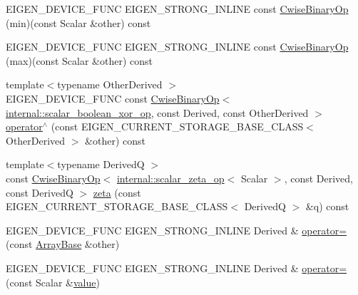 \begin{DoxyCompactItemize}
\item 
E\+I\+G\+E\+N\+\_\+\+D\+E\+V\+I\+C\+E\+\_\+\+F\+U\+NC E\+I\+G\+E\+N\+\_\+\+S\+T\+R\+O\+N\+G\+\_\+\+I\+N\+L\+I\+NE const \mbox{\hyperlink{class_eigen_1_1_array_base_afbdf5d7a9c31675ff41dc4f958d7cae0}{Cwise\+Binary\+Op}} (min)(const Scalar \&other) const
\item 
E\+I\+G\+E\+N\+\_\+\+D\+E\+V\+I\+C\+E\+\_\+\+F\+U\+NC E\+I\+G\+E\+N\+\_\+\+S\+T\+R\+O\+N\+G\+\_\+\+I\+N\+L\+I\+NE const \mbox{\hyperlink{class_eigen_1_1_array_base_a68d2610358935e40366d367da8777eee}{Cwise\+Binary\+Op}} (max)(const Scalar \&other) const
\item 
{\footnotesize template$<$typename Other\+Derived $>$ }\\E\+I\+G\+E\+N\+\_\+\+D\+E\+V\+I\+C\+E\+\_\+\+F\+U\+NC const \mbox{\hyperlink{class_eigen_1_1_cwise_binary_op}{Cwise\+Binary\+Op}}$<$ \mbox{\hyperlink{struct_eigen_1_1internal_1_1scalar__boolean__xor__op}{internal\+::scalar\+\_\+boolean\+\_\+xor\+\_\+op}}, const Derived, const Other\+Derived $>$ \mbox{\hyperlink{class_eigen_1_1_array_base_ad60a45873218a2346fe88caa300b1733}{operator$^\wedge$}} (const E\+I\+G\+E\+N\+\_\+\+C\+U\+R\+R\+E\+N\+T\+\_\+\+S\+T\+O\+R\+A\+G\+E\+\_\+\+B\+A\+S\+E\+\_\+\+C\+L\+A\+SS$<$ Other\+Derived $>$ \&other) const
\item 
{\footnotesize template$<$typename DerivedQ $>$ }\\const \mbox{\hyperlink{class_eigen_1_1_cwise_binary_op}{Cwise\+Binary\+Op}}$<$ \mbox{\hyperlink{struct_eigen_1_1internal_1_1scalar__zeta__op}{internal\+::scalar\+\_\+zeta\+\_\+op}}$<$ Scalar $>$, const Derived, const DerivedQ $>$ \mbox{\hyperlink{class_eigen_1_1_array_base_a49091054b94ccc456d8be5fbb4191079}{zeta}} (const E\+I\+G\+E\+N\+\_\+\+C\+U\+R\+R\+E\+N\+T\+\_\+\+S\+T\+O\+R\+A\+G\+E\+\_\+\+B\+A\+S\+E\+\_\+\+C\+L\+A\+SS$<$ DerivedQ $>$ \&q) const
\item 
E\+I\+G\+E\+N\+\_\+\+D\+E\+V\+I\+C\+E\+\_\+\+F\+U\+NC E\+I\+G\+E\+N\+\_\+\+S\+T\+R\+O\+N\+G\+\_\+\+I\+N\+L\+I\+NE Derived \& \mbox{\hyperlink{class_eigen_1_1_array_base_a72f5fe3d0805810e65eb897ccd3b6760}{operator=}} (const \mbox{\hyperlink{class_eigen_1_1_array_base}{Array\+Base}} \&other)
\item 
E\+I\+G\+E\+N\+\_\+\+D\+E\+V\+I\+C\+E\+\_\+\+F\+U\+NC E\+I\+G\+E\+N\+\_\+\+S\+T\+R\+O\+N\+G\+\_\+\+I\+N\+L\+I\+NE Derived \& \mbox{\hyperlink{class_eigen_1_1_array_base_aff99276e139d767dbe3bcb360d5710a3}{operator=}} (const Scalar \&\mbox{\hyperlink{class_eigen_1_1_dense_base_a8da735a6bfc7012606acf787156d10a0}{value}})
\item 

\end{DoxyCompactItemize}
